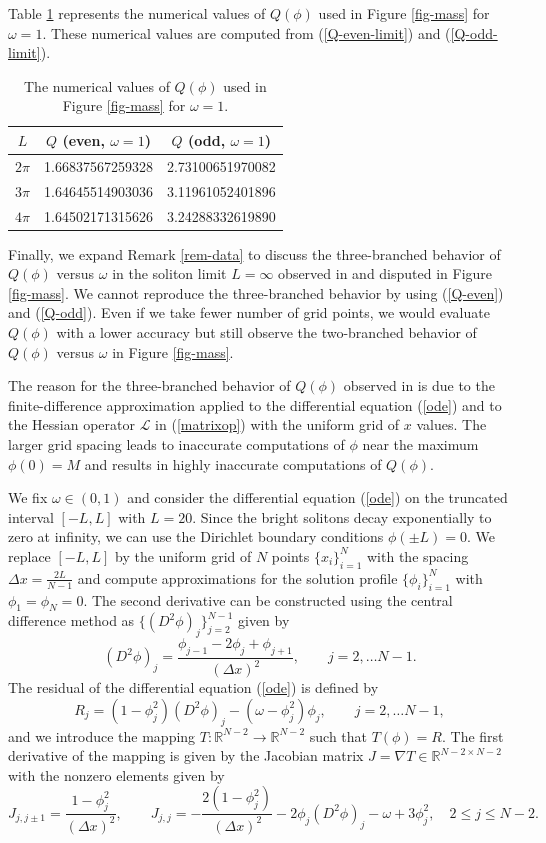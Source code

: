 \documentclass[12pt,reqno]{amsart}
\numberwithin{equation}{section}
\numberwithin{figure}{section}
\begin{document}
Table \ref{table-Q} represents the numerical values of $Q(\phi)$  used in Figure \ref{fig-mass} for $\omega = 1$. These numerical values are computed from (\ref{Q-even-limit}) and (\ref{Q-odd-limit}). 
\begin{table}[h!]
\centering
\begin{tabular}{|c|c|c|}
\hline
$L$ & $Q$ (even, $\omega = 1$) & $Q$ (odd, $\omega = 1$) \\
\hline
$2\pi$ & 1.66837567259328 & 2.73100651970082 \\
\hline
$3\pi$ & 1.64645514903036 & 3.11961052401896 \\
\hline
$4\pi$ & 1.64502171315626 & 3.24288332619890 \\
\hline
\end{tabular}
\vspace{0.25cm}
\caption{The numerical values of $Q(\phi)$ used in Figure \ref{fig-mass} for $\omega = 1$.}
\label{table-Q}
\end{table}

Finally, we expand Remark \ref{rem-data} to discuss the three-branched behavior of $Q(\phi)$ versus $\omega$ in the soliton limit $L = \infty$ observed 
in \cite{KPR24} and disputed in Figure \ref{fig-mass}. We cannot reproduce 
the three-branched behavior by using (\ref{Q-even}) and (\ref{Q-odd}). Even if we take fewer number of grid points, we would evaluate $Q(\phi)$ with a lower accuracy but still observe the two-branched behavior of $Q(\phi)$ versus $\omega$ in Figure \ref{fig-mass}. 


The reason for the three-branched behavior of $Q(\phi)$ observed in \cite{KPR24} is due to the finite-difference approximation applied to the differential equation (\ref{ode}) and to the Hessian operator $\mathcal{L}$ in (\ref{matrixop}) with the uniform grid of $x$ values. The larger grid spacing leads to inaccurate computations of $\phi$ near the maximum $\phi(0) = M$ and results in highly inaccurate computations of $Q(\phi)$. 

We fix $\omega \in (0,1)$ and consider the differential equation (\ref{ode}) 
on the truncated interval $[-L,L]$ with $L = 20$. Since the bright solitons 
decay exponentially to zero at infinity, we can use the Dirichlet boundary conditions $\phi(\pm L) = 0$. We replace $[-L,L]$ by the uniform grid of $N$ 
points $\{x_i\}_{i=1}^{N}$ with the spacing $\Delta x = \frac{2L}{N-1}$ 
and compute approximations for the solution profile  $\{\phi_i\}_{i=1}^N$ with $\phi_1 = \phi_N= 0$. The second derivative can be constructed using the central difference method as $\{ (D^2\phi)_j \}_{j=2}^{N-1}$ given by 
$$
(D^2\phi)_j= \frac{\phi_{j-1} - 2\phi_j + \phi_{j+1}}{(\Delta x)^2}, \quad \quad j = 2,\dots N-1.
$$
The residual of the differential equation (\ref{ode}) is defined by
$$
R_j = (1-\phi_j^2) (D^2 \phi)_j - (\omega - \phi_j^2) \phi_j, \quad \quad j = 2,\dots N-1,
$$
and we introduce the mapping $T: \mathbb R^{N-2} \to \mathbb R^{N-2}$ such that $T(\phi) = R$. The first derivative of the mapping is given by the Jacobian matrix $J = \nabla T \in \mathbb R^{N-2 \times N-2}$ with the nonzero elements given by 
$$
J_{j,j\pm1} = \frac{1-\phi_j^2}{(\Delta x)^2}, \quad \quad J_{j,j} = -\frac{2(1-\phi_j^2)}{(\Delta x)^2} - 2\phi_j (D^2\phi)_j - \omega + 3\phi_j^2, \quad 2 \leq j \leq N-2. 
$$
\end{document}
